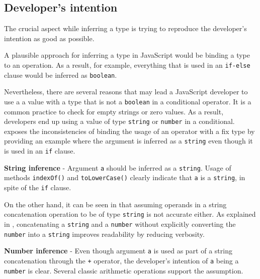 \subsection{Developer's intention}
The crucial aspect while inferring a type is trying to reproduce the developer's intention as good as possible. 

A plausible approach for inferring a type in JavaScript would be binding a type to an operation. As a result, for example, everything that is used in an \texttt{if-else} clause would be inferred as \texttt{boolean}.

Nevertheless, there are several reasons that may lead a JavaScript developer to use a a value with a type that is not a \texttt{boolean} in a conditional operator. It is a common practice to check for empty strings or zero values. As a result, developers end up using a value of type \texttt{string} or \texttt{number} in a conditional.  exposes the inconsistencies of binding the usage of an operator with a fix type by providing an example where the argument is inferred as a \texttt{string} even though it is used in an \texttt{if} clause.

\begin{code}
  \captionsetup{aboveskip=0pt, belowskip=10pt}
  \caption[String inference]{\textbf{String inference} - Argument \texttt{a} should be inferred as a \texttt{string}. Usage of methods \texttt{indexOf()} and \texttt{toLowerCase()} clearly indicate that \texttt{a} is a \texttt{string}, in spite of the \texttt{if} clause.}
  \label{code:type-inference-if-clause-boolean-string}
\end{code}

On the other hand, it can be seen in  that assuming operands in a string concatenation operation to be of type \texttt{string} is not accurate either. As explained in , concatenating a \texttt{string} and a \texttt{number} without explicitly converting the \texttt{number} into a \texttt{string} improves readability by reducing verbosity.

\begin{code}
  \captionsetup{aboveskip=0pt, belowskip=10pt}
  \caption[Number inference]{\textbf{Number inference} - Even though argument \texttt{a} is used as part of a string concatenation through the \texttt{+} operator, the developer's intention of \texttt{a} being a \texttt{number} is clear. Several classic arithmetic operations support the assumption.}
  \label{code:type-inference-number-with-plus-operator}
\end{code}

